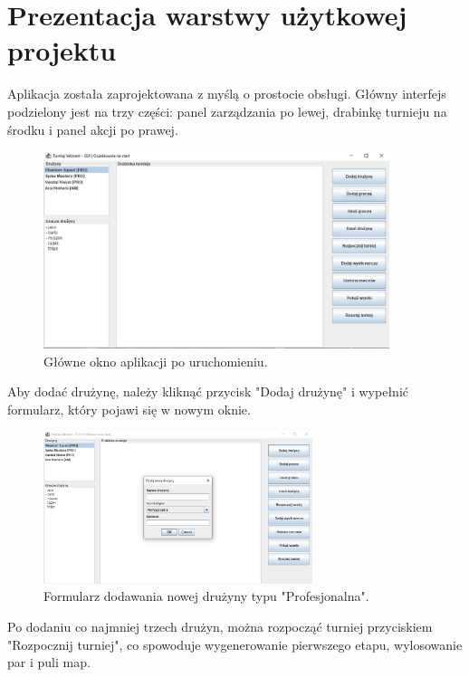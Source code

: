 \documentclass[12pt, a4paper]{article}
\begin{document}
\section{Prezentacja warstwy użytkowej projektu}
Aplikacja została zaprojektowana z myślą o prostocie obsługi. Główny interfejs podzielony jest na trzy części: panel zarządzania po lewej, drabinkę turnieju na środku i panel akcji po prawej.

\begin{figure}[H]
 \centering
 \includegraphics[width=0.9\textwidth]{dzialanie_programu_1.png}
 \caption{Główne okno aplikacji po uruchomieniu.}
 \label{fig:glowne_okno}
\end{figure}

Aby dodać drużynę, należy kliknąć przycisk "Dodaj drużynę" i wypełnić formularz, który pojawi się w nowym oknie. 

\begin{figure}[H]
 \centering
 \includegraphics[width=0.7\textwidth]{rysunek2.png}
 \caption{Formularz dodawania nowej drużyny typu "Profesjonalna".}
 \label{fig:dodaj_druzyne}
\end{figure}

Po dodaniu co najmniej trzech drużyn, można rozpocząć turniej przyciskiem "Rozpocznij turniej", co spowoduje wygenerowanie pierwszego etapu, wylosowanie par i puli map.
\end{document}
